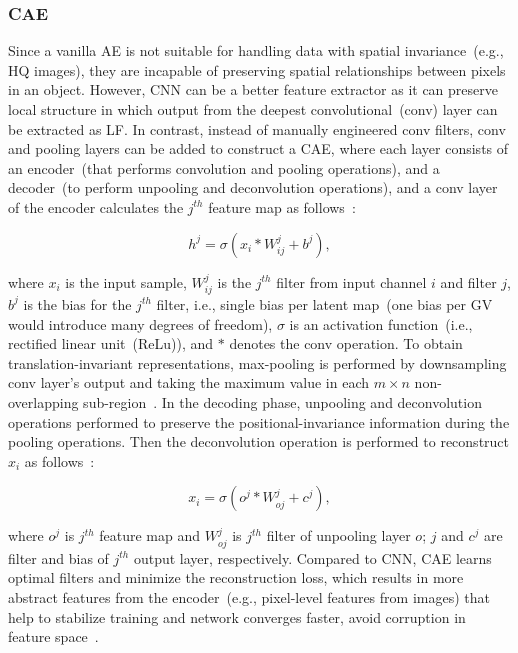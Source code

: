 \subsubsection{CAE}
Since a vanilla AE is not suitable for handling data with spatial invariance~(e.g., HQ images), they are incapable of preserving spatial relationships between pixels in an object. However, CNN can be a better feature extractor as it can preserve local structure in which output from the deepest convolutional~(conv) layer can be extracted as LF. In contrast, instead of manually engineered conv filters, conv and pooling layers can be added to construct a CAE, where each layer consists of an encoder~(that performs convolution and pooling operations), and a decoder~(to perform unpooling and deconvolution operations), and a conv layer of the encoder calculates the $j^{th}$ feature map as follows~\cite{alirezaie2019semantic}:

\begin{equation}
    h^{j}=\sigma\left(x_{i} * W_{ij}^{j}+b^{j}\right),
\end{equation}

where $x_i$ is the input sample, $W_{ij}^{j}$ is the $j^{th}$ filter from input channel $i$ and filter $j$, $b^j$ is the bias for the $j^{th}$ filter, i.e., single bias per latent map~(one bias per GV would introduce many degrees of freedom), $\sigma$ is an activation function~(i.e., rectified linear unit~(ReLu)), and $*$ denotes the conv operation. To obtain translation-invariant representations, max-pooling is performed by downsampling conv layer's output and taking the maximum value in each $m \times n$ non-overlapping sub-region~\cite{alirezaie2019semantic}. In the decoding phase, unpooling and deconvolution operations performed to preserve the positional-invariance information during the pooling operations. Then the deconvolution operation is performed to reconstruct $x_i$ as follows~\cite{alirezaie2019semantic}:

\begin{equation}
   x_i = \sigma\left(o^{j} * W_{oj}^{j}+c^{j}\right),
\end{equation}

where $o^j$ is $j^{th}$ feature map and $W_{oj}^{j}$ is $j^{th}$ filter of unpooling layer $o$; $j$ and $c^j$ are filter and bias of $j^{th}$ output layer, respectively. Compared to CNN, CAE learns optimal filters and minimize the reconstruction loss, which results in more abstract features from the encoder~(e.g., pixel-level features from images) that help to stabilize training and network converges faster, avoid corruption in feature space~\cite{guo2017deep}. 


